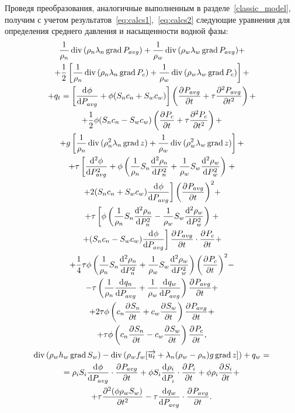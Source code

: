 Проведя преобразования, аналогичные выполненным в разделе~\ref{classic_model},
получим с учетом результатов~\eqref{eq:calcs1},~\eqref{eq:calcs2} следующие уравнения для определения
среднего давления и насыщенности водной фазы:
\begin{equation} \label{eq:full_pressure}
 \begin{gathered}
   \frac{1}{\rho_n} \diver{ (\rho_n\lambda_n\grad{ P_{avg}})} + \frac{1}{\rho_w} \diver{ (\rho_w\lambda_w\grad{ P_{avg}})}  +\\
   + \frac{1}{2} \left[ \frac{1}{\rho_n} \diver{ (\rho_n\lambda_n\grad{ P_c})} + \frac{1}{\rho_w} \diver{ (\rho_w\lambda_w\grad{ P_c})} \right]  +\\
   + q_t = \left[ \dd{\phi}{P_{avg}} + \phi (S_n c_n + S_w c_w) \right] \left( \pd{P_{avg}}{t} + \tau \pd[2]{P_{avg}}{t} \right) +\\
   + \frac{1}{2} \phi (S_n c_n - S_w c_w) \left( \pd{P_{c}}{t} + \tau \pd[2]{P_c}{t} \right) +\\
   + g \left[ \frac{1}{\rho_n} \diver{ (\rho_n^2\lambda_n\grad{ z})} + \frac{1}{\rho_w} \diver{ (\rho_w^2\lambda_w\grad{ z})} \right] +\\
   + \tau \left[ \dd[2]{\phi}{P_{avg}} + \phi \left( \frac{1}{\rho_n} S_n \dd[2]{\rho_n}{P_n} + \frac{1}{\rho_w} S_w \dd[2]{\rho_w}{P_w} \right) \right. + \\
   \left. + 2(S_n c_n + S_w c_w) \dd{\phi}{P_{avg}} \right] {\left( \pd{P_{avg}}{t}\right) }^2 +\\
   + \tau \left[ \phi \left( \frac{1}{\rho_n} S_n \dd[2]{\rho_n}{P_n} - \frac{1}{\rho_w} S_w \dd[2]{\rho_w}{P_w} \right) \right. +\\
   \left. + (S_n c_n - S_w c_w) \dd{\phi}{P_{avg}} \right] \pd{P_{avg}}{t} \cdot \pd{P_c}{t} +\\
   + \frac{1}{4} \tau \phi \left( \frac{1}{\rho_n} S_n \dd[2]{\rho_n}{P_n} + \frac{1}{\rho_w} S_w \dd[2]{\rho_w}{P_w} \right) {\left( \pd{P_c}{t}\right) }^2 -\\
  - \tau \left(\frac{1}{\rho_n}\dd{q_n}{P_{avg}} + \frac{1}{\rho_w}\dd{q_w}{P_{avg}}\right) \pd{P_{avg}}{t} +\\
   + 2 \tau \phi \left(c_n \pd{S_n}{t} + c_w \pd{S_w}{t} \right) \pd{P_{avg}}{t}+ \\
   + \tau \phi \left(c_n \pd{S_n}{t} - c_w \pd{S_w}{t} \right) \pd{P_c}{t},
 \end{gathered}
\end{equation}
\begin{equation} \label{eq:full_saturation}
 \begin{gathered}
  \diver{(\rho_w h_w \grad{ S_w})} - \diver{(\rho_w f_w[\overrightarrow{u_t} + \lambda_n(\rho_w - \rho_n)g \grad{ z}])} + q_w =\\
  = \rho_i S_i \dd{\phi}{P_{avg}} \cdot \pd{P_{avg}}{t} + \phi S_i \dd{\rho_i}{P_i} \cdot \pd{P_i}{t} + \phi \rho_i \pd{S_i}{t} +\\
  + \tau \pd[2]{(\phi \rho_w S_w)}{t} - \tau \dd{q_w}{P_{avg}} \cdot \pd{P_{avg}}{t}.
 \end{gathered}
\end{equation} 

